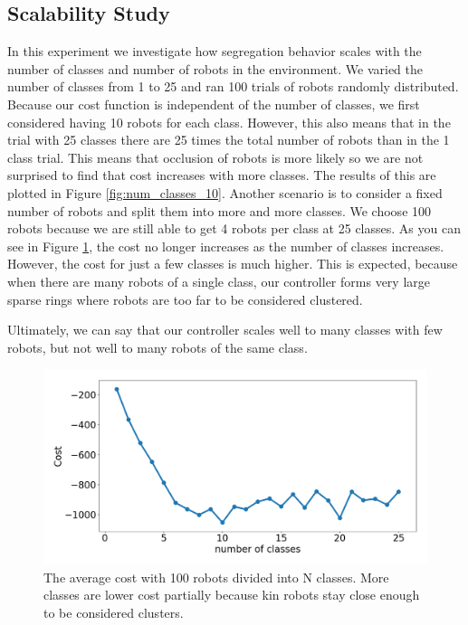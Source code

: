 \documentclass[conference]{IEEEtran}
\begin{document}
  \subsection{Scalability Study} \label{section:scalability}

    In this experiment we investigate how segregation behavior scales with the number of classes and number of robots in the environment. We varied the number of classes from 1 to 25 and ran 100 trials of robots randomly distributed. Because our cost function is independent of the number of classes, we first considered having 10 robots for each class. However, this also means that in the trial with 25 classes there are 25 times the total number of robots than in the 1 class trial. This means that occlusion of robots is more likely so we are not surprised to find that cost increases with more classes. The results of this are plotted in Figure  \ref{fig:num_classes_10}. Another scenario is to consider a fixed number of robots and split them into more and more classes. We choose 100 robots because we are still able to get 4 robots per class at 25 classes. As you can see in Figure \ref{fig:num_classes_100}, the cost no longer increases as the number of classes increases. However, the cost for just a few classes is much higher. This is expected, because when there are many robots of a single class, our controller forms very large sparse rings where robots are too far to be considered clustered.

    Ultimately, we can say that our controller scales well to many classes with few robots, but not well to many robots of the same class.

    \begin{figure}[H]
      \centering
      \includegraphics[width=1\linewidth]{./images/num_classes_vs_cost_100_robots.png}
      \caption{The average cost with 100 robots divided into N classes. More classes are lower cost partially because kin robots stay close enough to be considered clusters.}
      \label{fig:num_classes_100}
    \end{figure}
\end{document}
